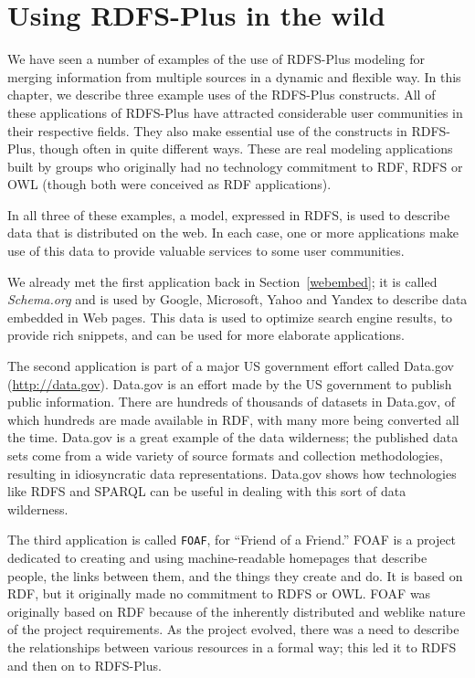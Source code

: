 \chapter{Using RDFS-Plus in the wild}
\label{ch10}

We have seen a number of examples of the use of RDFS-Plus modeling for
merging information from multiple sources in a dynamic and flexible way.
In this chapter, we describe three  example uses of the RDFS-Plus
constructs. All of these applications of RDFS-Plus have attracted
considerable user communities in their respective fields. They
also make essential use of the constructs in RDFS-Plus, though often in
quite different ways. These are real modeling applications built by
groups who originally had no technology commitment to RDF, RDFS or OWL
(though both were conceived as RDF applications).

In all three of these examples, a model, expressed in RDFS, is used to describe
data that is distributed on the web.  In each case, one or more applications
make use of this data to provide valuable services to some user communities. 



We already met the first application back in Section~\ref{webembed}; it is 
called \emph{Schema.org} and is used by Google, Microsoft, Yahoo and Yandex 
to describe data embedded in Web pages.  This data is used to optimize search
engine results, to provide rich snippets, and can be used for more elaborate 
applications. 

The second application is part of a major US government effort called
Data.gov (\url{http://data.gov}). Data.gov is an effort made by the US
government to publish public information. There are hundreds of
thousands of datasets in Data.gov, of which hundreds are made available
in RDF, with many more being converted all the time. Data.gov is a great
example of the data wilderness; the published data sets
come from a wide variety of source formats and collection methodologies,
resulting in idiosyncratic data representations. Data.gov shows how
technologies like RDFS and SPARQL can be useful in dealing with this
sort of data wilderness.

The third application is called \texttt{FOAF}, for ``Friend of a Friend.'' FOAF
is a project dedicated to creating and using machine-readable homepages
that describe people, the links between them, and the things they create
and do. It is based on RDF, but it originally made no commitment to RDFS
or OWL.
FOAF was originally based on RDF because of the inherently distributed
and weblike nature of the 
project requirements. As the project evolved, there was a need to
describe the relationships between various resources in a formal way;
this led it to RDFS and then on to RDFS-Plus.


